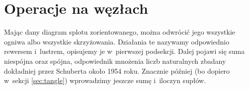 
\section{Operacje na węzłach}
Mając dany diagram splotu zorientowanego, można odwrócić jego wszystkie ogniwa albo wszystkie skrzyżowania.
Działania te nazywamy odpowiednio rewersem i~lustrem, opisujemy je w~pierwszej podsekcji.
Dalej pojawi się suma niespójna oraz spójna, odpowiednik mnożenia liczb naturalnych zbadany dokładniej przez Schuberta około 1954 roku.
%
Znacznie później (bo dopiero w~sekcji \ref{sec:tangle}) wprowadzimy jeszcze sumę i~iloczyn supłów.







